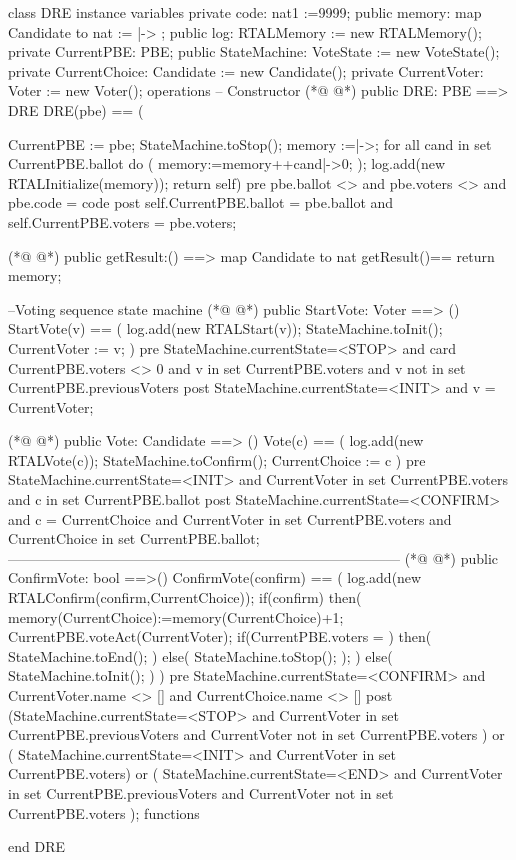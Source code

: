 \begin{vdmpp}
class DRE
instance variables
 private code: nat1 :=9999;
 public memory: map Candidate to nat := {|->} ;
 public log: RTALMemory := new RTALMemory();
 private CurrentPBE: PBE;
 public StateMachine: VoteState := new VoteState();
 private CurrentChoice: Candidate := new Candidate(); 
 private CurrentVoter: Voter := new Voter();
operations
-- Constructor
(*@
\label{DRE:12}
@*)
 public DRE: PBE ==> DRE 
 DRE(pbe) == (
       
       CurrentPBE := pbe;
       StateMachine.toStop();
       memory :={|->};
       for all cand in set CurrentPBE.ballot do
          (
        memory:=memory++{cand|->0};
          );
          log.add(new RTALInitialize(memory));
       return self)
 pre 
  pbe.ballot <> {}
  and pbe.voters <> {}
  and pbe.code = code
 post 
  self.CurrentPBE.ballot = pbe.ballot
  and self.CurrentPBE.voters = pbe.voters;
 
(*@
\label{getResult:32}
@*)
 public getResult:() ==> map Candidate to nat
 getResult()== return memory;
 
--Voting sequence state machine
(*@
\label{StartVote:36}
@*)
 public StartVote: Voter ==> ()
 StartVote(v) == (
   log.add(new RTALStart(v));
   StateMachine.toInit();
   CurrentVoter := v;
 )
 pre StateMachine.currentState=<STOP>
   and card CurrentPBE.voters <> 0
   and v in set CurrentPBE.voters
   and v not in set CurrentPBE.previousVoters
 post StateMachine.currentState=<INIT>
    and v = CurrentVoter;

(*@
\label{Vote:49}
@*)
 public Vote: Candidate ==> ()
 Vote(c) == (
   log.add(new RTALVote(c));
   StateMachine.toConfirm();
   CurrentChoice := c
 )
 pre StateMachine.currentState=<INIT>
   and CurrentVoter in set CurrentPBE.voters
   and c in set CurrentPBE.ballot
 post StateMachine.currentState=<CONFIRM>
    and c = CurrentChoice
    and CurrentVoter in set CurrentPBE.voters
    and CurrentChoice in set CurrentPBE.ballot;
 ------------------------------------------------------------------------------------
(*@
\label{ConfirmVote:63}
@*)
 public ConfirmVote: bool ==>()
 ConfirmVote(confirm) == (
   log.add(new RTALConfirm(confirm,CurrentChoice));
   if(confirm)
   then(
     memory(CurrentChoice):=memory(CurrentChoice)+1;
     CurrentPBE.voteAct(CurrentVoter); 
     if(CurrentPBE.voters = {})
     then(
      StateMachine.toEnd();
     )
     else(
      StateMachine.toStop();
     );
     )
   else(
     StateMachine.toInit();
     )
 )
 pre StateMachine.currentState=<CONFIRM> 
   and CurrentVoter.name <> []
   and CurrentChoice.name <> []
 post (StateMachine.currentState=<STOP>
    and CurrentVoter in set CurrentPBE.previousVoters
    and CurrentVoter not in set CurrentPBE.voters
    )
    or (
    StateMachine.currentState=<INIT>
    and CurrentVoter in set CurrentPBE.voters)
    or (
    StateMachine.currentState=<END>
    and CurrentVoter in set CurrentPBE.previousVoters
    and CurrentVoter not in set CurrentPBE.voters
    );
functions
 
end DRE
\end{vdmpp}
